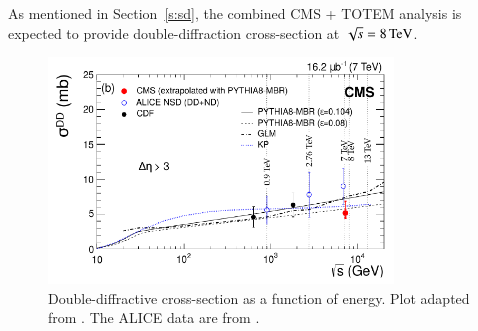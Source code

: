 \documentclass{webofc}
\def\un#1{\,{\rm #1}}
\begin{document}
As mentioned in Section~\ref{s:sd}, the combined CMS + TOTEM analysis is expected to provide double-diffraction cross-section at $\sqrt s = 8\un{TeV}$.

\begin{figure}[h]
\centering
\includegraphics[height=6cm,clip]{fig/si_dd_vs_s.pdf}
\vskip-4mm
\caption{Double-diffractive cross-section as a function of energy. Plot adapted from \cite{cms-diff-7tev}. The ALICE data are from \cite{alice-inel-sd-dd}.}
\label{f:dd cs summary}
\end{figure}

\end{document}
